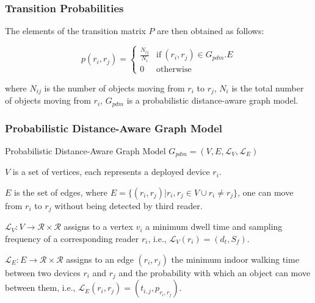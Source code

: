 
\begin{frame}
\frametitle{Transition Probabilities}

The elements of the transition matrix $P$ are then obtained as follows:

\vspace{10pt}

\begin{equation}
  p(r_i, r_j) = \left\{\begin{matrix}
\frac{N_{ij}}{N_i} & \text{if}~(r_i, r_j) \in G_{pdm}.E\\
0 & \text{otherwise}
\end{matrix}\right.
\end{equation}

\vspace{10pt}

where $N_{ij}$ is the number of objects moving from $r_i$ to $r_j$, $N_i$ is the total number of objects moving from $r_i$, $G_{pdm}$ is a probabilistic distance-aware graph model.

\end{frame}


\begin{frame}
\frametitle{Probabilistic Distance-Aware Graph Model}

\begin{block}{Probabilistic Distance-Aware Graph Model}
  $G_{pdm} = (V, E, \mathcal{L}_V, \mathcal{L}_E)$
  \begin{fitemize}
    \item $V$ is a set of vertices, each represents a deployed device $r_i$.
    \item $E$ is the set of edges, where $E = \{ (r_i, r_j) | r_i, r _j \in V \cup r_i \neq r_j \}$, one can move from $r_i$ to $r_j$ without being detected by third reader.
    \item $\mathcal{L}_V: V \rightarrow \mathcal{R} \times \mathcal{R}$ assigns to a vertex $v_i$ a minimum dwell time and sampling frequency of a corresponding reader $r_i$, i.e., $\mathcal{L}_V(r_i) = (d_t, S_f)$.
    \item $\mathcal{L}_E: E \rightarrow \mathcal{R} \times \mathcal{R}$ assigns to an edge $(r_i, r_j)$ the minimum indoor walking time between two devices $r_i$ and $r_j$ and the probability with which an object can move between them, i.e., $\mathcal{L}_E(r_i, r_j) = (t_{i,j}, p_{r_i,r_j})$.
  \end{fitemize}
\end{block}

\end{frame}

